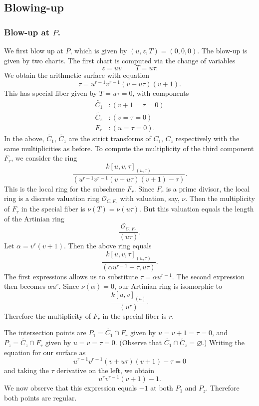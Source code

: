 \documentclass{article}
\theoremstyle{plain}
\theoremstyle{definition}
\theoremstyle{remark}
\renewcommand{\emptyset}{\varnothing}
\renewcommand{\tilde}[1]{\widetilde{#1}}
\newcommand{\sO}{\ensuremath{\mathscr{O}}}
\begin{document}
\subsection{Blowing-up}
\label{sec:blowing-up}

\subsubsection{Blow-up at $P$.}
\label{sec:blow-up-P}

We first blow up at $P$, which is given by $(u,z,T) = (0,0,0)$. The blow-up is given by two charts. The first chart is computed via the change of variables
\[
z = uv \qquad T = u\tau.
\]
We obtain the arithmetic surface with equation
\[
\tau = u^{r-1}v^{r-1}(v + u\tau)(v + 1).
\]
This has special fiber given by $T = u\tau = 0$, with components
\begin{align*}
  \tilde{C_1}&: (v + 1 = \tau = 0) \\
  \tilde{C_z}&: (v = \tau = 0) \\
  F_r&: (u = \tau = 0).
\end{align*}
In the above, $\tilde{C_1}$, $\tilde{C_z}$ are the strict transforms of $C_1$, $C_z$ respectively with the same multiplicities as before. To compute the multiplicity of the third component $F_r$, we consider the ring
\[
\frac{k[u,v,\tau]_{(u,\tau)}}{(u^{r-1}v^{r-1}(v + u\tau)(v + 1) - \tau)}.
\]
This is the local ring for the subscheme $F_r$. Since $F_r$ is a prime divisor, the local ring is a discrete valuation ring $\sO_{C,F_r}$ with valuation, say, $\nu$. Then the multiplicity of $F_r$ in the special fiber is $\nu(T) = \nu(u\tau)$. But this valuation equals the length of the Artinian ring
\[
\frac{\sO_{C,F_r}}{(u\tau)}.
\]
Let $\alpha = v^{r}(v+1)$. Then the above ring equals
\[
\frac{k[u,v,\tau]_{(u,\tau)}}{(\alpha u^{r-1} - \tau, u\tau)}.
\]
The first expressions allows us to substitute $\tau = \alpha u^{r-1}$. The second expression then becomes $\alpha u^r$. Since $\nu(\alpha) = 0$, our Artinian ring is isomorphic to
\[
\frac{k[u,v]_{(u)}}{(u^r)}.
\]
Therefore the multiplicity of $F_r$ in the special fiber is $r$.

The intersection points are $P_1 = \tilde{C_1} \cap F_r$ given by $u=v+1=\tau=0$, and $P_z = \tilde{C_z} \cap F_r$ given by $u=v=\tau=0$. (Observe that $\tilde{C_1} \cap \tilde{C_z} = \emptyset$.) Writing the equation for our surface as
\[
u^{r-1}v^{r-1}(v + u\tau)(v + 1) - \tau = 0
\]
and taking the $\tau$ derivative on the left, we obtain
\[
u^rv^{r-1}(v + 1) - 1.
\]
We now observe that this expression equals $-1$ at both $P_1$ and $P_z$. Therefore both points are regular.
\end{document}
